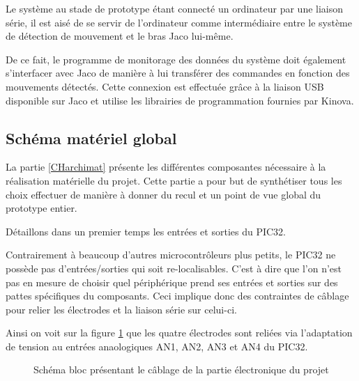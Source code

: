 \documentclass[letterpaper, twoside, 12pt, memoire, creativecommons, hyperref]{thETS}
\begin{document}
Le système au stade de prototype étant connecté un ordinateur par une liaison série, il est aisé de se servir de l'ordinateur comme intermédiaire entre le système de détection de mouvement et le bras Jaco lui-même.

De ce fait, le programme de monitorage des données du système doit également s'interfacer avec Jaco de manière à lui transférer des commandes en fonction des mouvements détectés. Cette connexion est effectuée grâce à la liaison USB disponible sur Jaco et utilise les librairies de programmation fournies par Kinova.

\subsection{Schéma matériel global}

La partie \ref{CHarchimat} présente les différentes composantes nécessaire à la réalisation matérielle du projet. Cette partie a pour but de synthétiser tous les choix effectuer de manière à donner du recul et un point de vue global du prototype entier. 

Détaillons dans un premier temps les entrées et sorties du PIC32. 

Contrairement à beaucoup d'autres microcontrôleurs plus petits, le PIC32 ne possède pas d'entrées/sorties qui soit re-localisables. C'est à dire que l'on n'est pas en mesure de choisir quel périphérique prend ses entrées et sorties sur des pattes spécifiques du composants. Ceci implique donc des contraintes de câblage pour relier les électrodes et la liaison série sur celui-ci. 

Ainsi on voit sur la figure \ref{fig:cablagePic} que les quatre électrodes sont reliées via l'adaptation de tension au entrées anaologiques AN1, AN2, AN3 et AN4 du PIC32. 

\begin{figure}
	\centering
	\caption{Schéma bloc présentant le câblage de la partie électronique du projet}
	\label{fig:cablagePic}
\end{figure}
\end{document}
